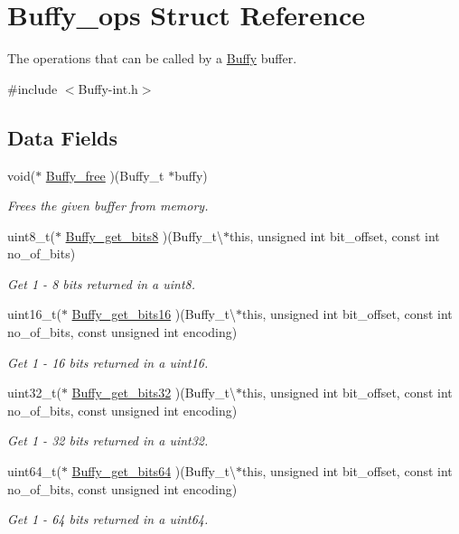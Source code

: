 \hypertarget{struct_buffy__ops}{}\section{Buffy\+\_\+ops Struct Reference}
\label{struct_buffy__ops}


The operations that can be called by a \hyperlink{struct_buffy}{Buffy} buffer.  




{\ttfamily \#include $<$Buffy-\/int.\+h$>$}

\subsection*{Data Fields}
\begin{DoxyCompactItemize}
\item 
void($\ast$ \hyperlink{struct_buffy__ops_ab7bf66b999e3940f3a96e2c433f7cce3}{Buffy\+\_\+free} )(Buffy\+\_\+t $\ast$buffy)
\begin{DoxyCompactList}\small\item\em Frees the given buffer from memory. \end{DoxyCompactList}\item 
uint8\+\_\+t($\ast$ \hyperlink{struct_buffy__ops_a6f461fe87b9f795fb7ffd3db096297ea}{Buffy\+\_\+get\+\_\+bits8} )(Buffy\+\_\+t\textbackslash{}$\ast$this, unsigned int bit\+\_\+offset, const int no\+\_\+of\+\_\+bits)
\begin{DoxyCompactList}\small\item\em Get 1 -\/ 8 bits returned in a uint8. \end{DoxyCompactList}\item 
uint16\+\_\+t($\ast$ \hyperlink{struct_buffy__ops_a3df506773dc40f33aac389a45546b7ba}{Buffy\+\_\+get\+\_\+bits16} )(Buffy\+\_\+t\textbackslash{}$\ast$this, unsigned int bit\+\_\+offset, const int no\+\_\+of\+\_\+bits, const unsigned int encoding)
\begin{DoxyCompactList}\small\item\em Get 1 -\/ 16 bits returned in a uint16. \end{DoxyCompactList}\item 
uint32\+\_\+t($\ast$ \hyperlink{struct_buffy__ops_a79fb9eb286f713f3fcbd0c5844422320}{Buffy\+\_\+get\+\_\+bits32} )(Buffy\+\_\+t\textbackslash{}$\ast$this, unsigned int bit\+\_\+offset, const int no\+\_\+of\+\_\+bits, const unsigned int encoding)
\begin{DoxyCompactList}\small\item\em Get 1 -\/ 32 bits returned in a uint32. \end{DoxyCompactList}\item 
uint64\+\_\+t($\ast$ \hyperlink{struct_buffy__ops_a513ddb6f7d6baa2f916e08620e553ad0}{Buffy\+\_\+get\+\_\+bits64} )(Buffy\+\_\+t\textbackslash{}$\ast$this, unsigned int bit\+\_\+offset, const int no\+\_\+of\+\_\+bits, const unsigned int encoding)
\begin{DoxyCompactList}\small\item\em Get 1 -\/ 64 bits returned in a uint64. \end{DoxyCompactList}\end{DoxyCompactItemize}


